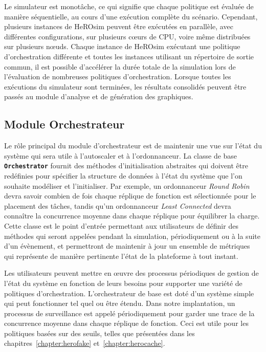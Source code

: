 Le simulateur est monotâche, ce qui signifie que chaque politique est évaluée de manière séquentielle, au cours d'une exécution complète du scénario. Cependant, plusieurs instances de HeROsim peuvent être exécutées en parallèle, avec différentes configurations, sur plusieurs cœurs de \gls{CPU}, voire même distribuées sur plusieurs nœuds. Chaque instance de HeROsim exécutant une politique d'orchestration différente et toutes les instances utilisant un répertoire de sortie commun, il est possible d'accélérer la durée totale de la simulation lors de l'évaluation de nombreuses politiques d'orchestration. Lorsque toutes les exécutions du simulateur sont terminées, les résultats consolidés peuvent être passés au module d'analyse et de génération des graphiques.

\subsection{Module Orchestrateur}

Le rôle principal du module d'orchestrateur est de maintenir une vue sur l'état du système qui sera utile à l'autoscaler et à l'ordonnanceur. La classe de base \textbf{\texttt{Orchestrator}} fournit des méthodes d'initialisation abstraites qui doivent être redéfinies pour spécifier la structure de données à l'état du système que l'on souhaite modéliser et l'initialiser. Par exemple, un ordonnanceur \textit{Round Robin} devra savoir combien de fois chaque réplique de fonction est sélectionnée pour le placement des tâches, tandis qu'un ordonnanceur \textit{Least Connected} devra connaître la concurrence moyenne dans chaque réplique pour équilibrer la charge. Cette classe est le point d'entrée permettant aux utilisateurs de définir des méthodes qui seront appelées pendant la simulation, périodiquement ou à la suite d'un évènement, et permettront de maintenir à jour un ensemble de métriques qui représente de manière pertinente l'état de la plateforme à tout instant.

Les utilisateurs peuvent mettre en œuvre des processus périodiques de gestion de l'état du système en fonction de leurs besoins pour supporter une variété de politiques d'orchestration. L'orchestrateur de base est doté d'un système simple qui peut fonctionner tel quel ou être étendu. Dans notre implantation, un processus de surveillance est appelé périodiquement pour garder une trace de la concurrence moyenne dans chaque réplique de fonction. Ceci est utile pour les politiques basées sur des seuils, telles que présentées dans les chapitres~\ref{chapter:herofake} et~\ref{chapter:herocache}.

